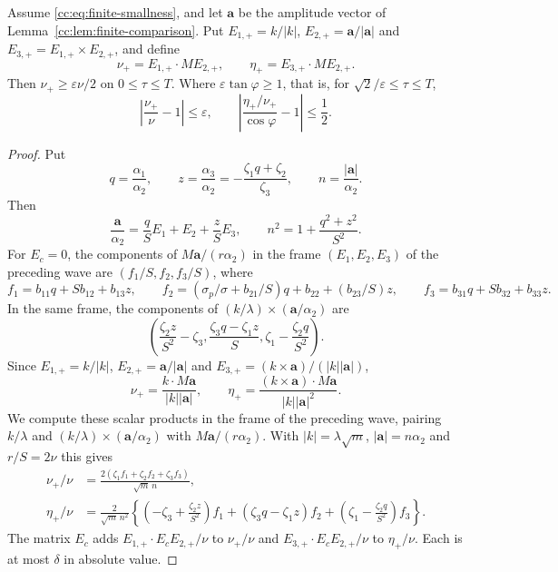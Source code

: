 \begin{lemma}\label{cc:lem:new-wave-couplings}
Assume \eqref{cc:eq:finite-smallness}, and let $\mathbf a$ be the
amplitude vector of Lemma~\ref{cc:lem:finite-comparison}. Put
$E_{1,+}=k/|k|$, $E_{2,+}=\mathbf a/|\mathbf a|$ and
$E_{3,+}=E_{1,+}\times E_{2,+}$, and define
\[
 \nu_+=E_{1,+}\cdot ME_{2,+},\qquad
 \eta_+=E_{3,+}\cdot ME_{2,+}.
\]
Then $\nu_+\ge\varepsilon\nu/2$ on $0\le\tau\le T$. Where
$\varepsilon\tan\varphi\ge1$, that is, for
$\sqrt2/\varepsilon\le\tau\le T$,
\begin{equation}\label{cc:eq:actual-ratio}
 \left|\frac{\nu_+}{\nu}-1\right|\le\varepsilon,\qquad
 \left|\frac{\eta_+/\nu_+}{\cos\varphi}-1\right|\le\frac12.
\end{equation}
\end{lemma}
\begin{proof}
Put
\[
 q=\frac{\alpha_1}{\alpha_2},\qquad
 z=\frac{\alpha_3}{\alpha_2}
   =-\frac{\zeta_1q+\zeta_2}{\zeta_3},\qquad n=\frac{|\mathbf a|}{\alpha_2}.
\]
Then
\[
 \frac{\mathbf a}{\alpha_2}=\frac qSE_1+E_2+\frac zSE_3,\qquad
 n^2=1+\frac{q^2+z^2}{S^2}.
\]
For $E_c=0$, the components of $M\mathbf a/(r\alpha_2)$ in the frame
$(E_1,E_2,E_3)$ of the preceding wave are $(f_1/S,f_2,f_3/S)$, where
\[
 f_1=b_{11}q+Sb_{12}+b_{13}z,\qquad
 f_2=(\sigma_p/\sigma+b_{21}/S)q+b_{22}+(b_{23}/S)z,\qquad
 f_3=b_{31}q+Sb_{32}+b_{33}z.
\]
In the same frame, the components of
$(k/\lambda)\times(\mathbf a/\alpha_2)$ are
\[
 \left(\frac{\zeta_2z}{S^2}-\zeta_3,
       \frac{\zeta_3q-\zeta_1z}{S},
       \zeta_1-\frac{\zeta_2q}{S^2}\right).
\]
Since $E_{1,+}=k/|k|$, $E_{2,+}=\mathbf a/|\mathbf a|$ and
$E_{3,+}=(k\times\mathbf a)/(|k||\mathbf a|)$,
\[
 \nu_+=\frac{k\cdot M\mathbf a}{|k||\mathbf a|},\qquad
 \eta_+=\frac{(k\times\mathbf a)\cdot M\mathbf a}{|k||\mathbf a|^2}.
\]
We compute these scalar products in the frame of the preceding wave,
pairing $k/\lambda$ and $(k/\lambda)\times(\mathbf a/\alpha_2)$ with
$M\mathbf a/(r\alpha_2)$. With $|k|=\lambda\sqrt m$,
$|\mathbf a|=n\alpha_2$ and $r/S=2\nu$ this gives
\begin{align}\label{cc:eq:coupling-rational}
 \nu_+/\nu&=\frac{2(\zeta_1f_1+\zeta_2f_2+\zeta_3f_3)}{\sqrt m\,n},\\
 \eta_+/\nu&=\frac{2}{\sqrt m\,n^2}
  \left\{\left(-\zeta_3+\frac{\zeta_2z}{S^2}\right)f_1
       +(\zeta_3q-\zeta_1z)f_2
       +\left(\zeta_1-\frac{\zeta_2q}{S^2}\right)f_3\right\}.
 \label{cc:eq:coupling-rational-end}
\end{align}
The matrix $E_c$ adds $E_{1,+}\cdot E_cE_{2,+}/\nu$ to $\nu_+/\nu$
and $E_{3,+}\cdot E_cE_{2,+}/\nu$ to $\eta_+/\nu$. Each is at most
$\delta$ in absolute value.


\end{proof}
